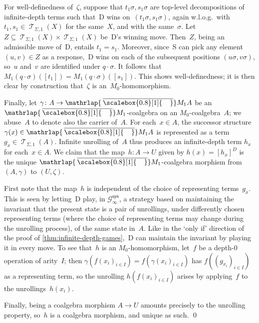 \documentclass[sigconf,
			final%
			nonacm
                        ]{acmart}
\numberwithin{equation}{section}
\numberwithin{equation}{section}
\theoremstyle{plain}
\theoremstyle{definition}
\newcommand{\mybar}[3]{%
  \mathrlap{\hspace{#2}\overline{\scalebox{#1}[1]{\hphantom{\ensuremath{#3}}\vphantom{\rule{0pt}{5.5pt}}}}}\ensuremath{#3}
}
\newcommand{\barM}{\mybar{0.8}{2pt}{M}_1}
\newcommand{\syn}{\mathsf{syn}}
\DeclareMathOperator{\Terms}{\mathscr{T}}
\newcommand{\Termsarg}[1]{\Terms_{\!#1}}
\newcommand{\CalG}{\mathcal{G}}             %
\begin{document}
  For well-definedness of~$\zeta$, suppose that $t_1\sigma, s_1\sigma$
  are top-level decompositions of infinite-depth terms such that~D
  wins on~$(t_1\sigma,s_1\sigma)$, again w.l.o.g.~with
  $t_1,s_1\in\Termsarg{\Sigma,1}(X)$ for the same~$X$, and with the
  same~$\sigma$.
  Let~$Z\subseteq\Termsarg{\Sigma,1}(X)\times\Termsarg{\Sigma,1}(X)$
  be~D's winning move. Then~$Z$, being an admissible move of~D,
  entails $t_1=s_1$. Moreover, since~S can pick any element
  $(u,v)\in Z$ as a response,~D wins on each of the subsequent
  positions $(u\sigma,v\sigma)$, so~$u$ and~$v$ are identified under
  $q\cdot\sigma$. It follows that
  $M_1(q\cdot\sigma)([t_1])=M_1(q\cdot\sigma)([s_1])$. This shows
  well-definedness; it is then clear by construction that~$\zeta$ is
  an~$M_0$-homomorphism.%

  Finally, let $\gamma\colon A\to\barM A$ be an $\barM$-coalgebra on
  an $M_0$-coalgebra~$A$; we abuse~$A$ to denote also the carrier
  of~$A$.%
  For each~$x\in A$, the successor structure
  $\gamma(x)\in\barM A$ is represented as a term
  $g_x\in\Termsarg{\Sigma,1}(A)$. Infinite unrolling of~$A$ thus
  produces an infinite-depth term $h_x$ for each~$x\in A$. We claim
  that the map~$h\colon A\to U$ given by $h(x)=[h_x]^D$ is the unique
  $\barM$-coalgebra morphism from $(A,\gamma)$ to $(U,\zeta)$.

  First note that the map~$h$ is independent of the choice of
  representing terms~$g_x$. This is seen by letting~D play, in
  $\CalG_\infty^\syn$, a strategy based on maintaining the invariant
  that the present state is a pair of unrollings, under differently
  chosen representing terms (where the choice of representing terms may change
  during the unrolling process), of the same state in~$A$.
  Like in the
  `only if' direction of the proof of
  \cref{thm:infinite-depth-games},~D can maintain the invariant by
  playing it in every move.%
    To see that~$h$ is an
  $M_0$-homomorphism, let~$f$ be a depth-0 operation of arity~$I$;
  then $\gamma(f(x_i)_{i\in I})=f(\gamma(x_i)_{i\in I})$ has
  $f((g_{x_i})_{i\in I})$ as a representing term, so the unrolling
  $h(f(x_i)_{i\in I})$ arises by applying~$f$ to the
  unrollings~$h(x_i)$.

  Finally, being a coalgebra morphism $A\to U$ amounts precisely to
  the unrolling property, so~$h$ is a coalgebra morphism, and unique
  as such.
  \qed
\end{document}

